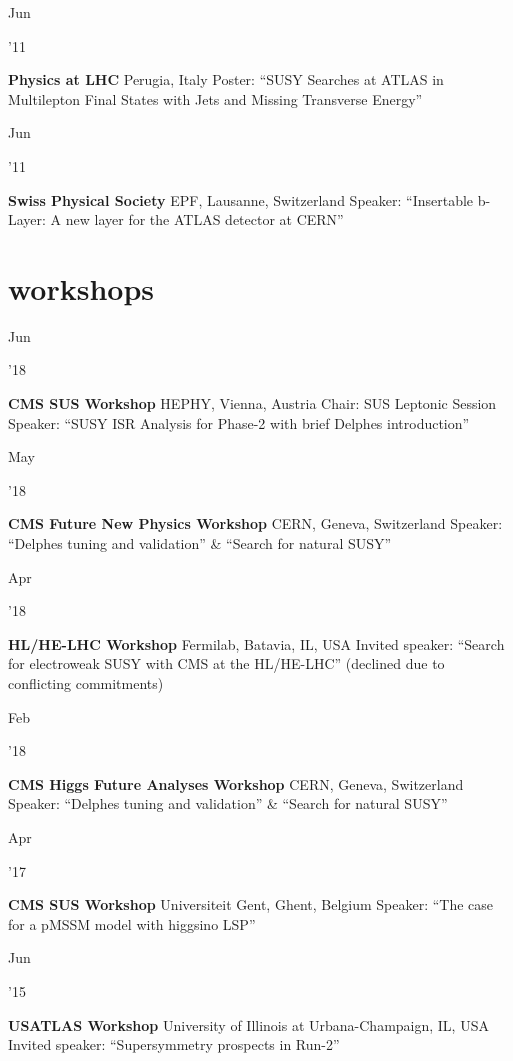 \documentclass[]{cv} %
\begin{document}
\begin{entrylist}
  \entry
  {\parbox[t]{\parboxWidthOne}{Jun}\parbox[t]{\parboxWidthTwo}{\hfill '11}}
  {\textbf{Physics at LHC}}
  {Perugia, Italy}
  {Poster: ``SUSY Searches at ATLAS in Multilepton Final States with Jets and Missing Transverse Energy''}

  \entry
  {\parbox[t]{\parboxWidthOne}{Jun}\parbox[t]{\parboxWidthTwo}{\hfill '11}}
  {\textbf{Swiss Physical Society}}
  {EPF, Lausanne, Switzerland}
  {Speaker: ``Insertable b-Layer: A new layer for the ATLAS detector at CERN''}

\end{entrylist}

\section{workshops}

\begin{entrylist}

  \entry
  {\parbox[t]{\parboxWidthOne}{Jun}\parbox[t]{\parboxWidthTwo}{\hfill '18}}
  {\textbf{CMS SUS Workshop}}
  {HEPHY, Vienna, Austria}
  {Chair: SUS Leptonic Session\\
  Speaker: ``SUSY ISR Analysis for Phase-2 with brief Delphes introduction''}

  \entry
  {\parbox[t]{\parboxWidthOne}{May}\parbox[t]{\parboxWidthTwo}{\hfill '18}}
  {\textbf{CMS Future New Physics Workshop}}
  {CERN, Geneva, Switzerland}
  {Speaker: ``Delphes tuning and validation'' \& ``Search for natural SUSY''}

  \entry
  {\parbox[t]{\parboxWidthOne}{Apr}\parbox[t]{\parboxWidthTwo}{\hfill '18}}
  {\textbf{HL/HE-LHC Workshop}}
  {Fermilab, Batavia, IL, USA}
  {Invited speaker: ``Search for electroweak SUSY with CMS at the HL/HE-LHC'' (declined
  due to conflicting commitments)}

  \entry
  {\parbox[t]{\parboxWidthOne}{Feb}\parbox[t]{\parboxWidthTwo}{\hfill '18}}
  {\textbf{CMS Higgs Future Analyses Workshop}}
  {CERN, Geneva, Switzerland}
  {Speaker: ``Delphes tuning and validation'' \& ``Search for natural SUSY''}

  \entry
  {\parbox[t]{\parboxWidthOne}{Apr}\parbox[t]{\parboxWidthTwo}{\hfill '17}}
  {\textbf{CMS SUS Workshop}}
  {Universiteit Gent, Ghent, Belgium}
  {Speaker: ``The case for a pMSSM model with higgsino LSP''}

  \entry
  {\parbox[t]{\parboxWidthOne}{Jun}\parbox[t]{\parboxWidthTwo}{\hfill '15}}
  {\textbf{USATLAS Workshop}}
  {University of Illinois at Urbana-Champaign, IL, USA}
  {Invited speaker: ``Supersymmetry prospects in Run-2''}

\end{entrylist}
\end{document}

